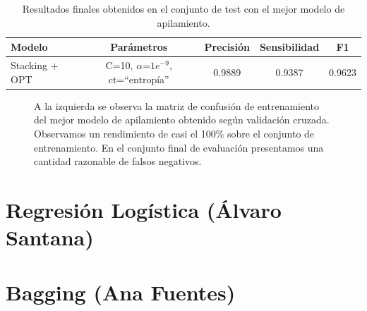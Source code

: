 \documentclass[12pt,letterpaper]{article}
\begin{document}
\begin{table}[!ht]
    \centering
    \begin{tabular}{lcccc}
        \hline
        \textbf{Modelo} & \textbf{Parámetros} &\textbf{Precisión} &\textbf{Sensibilidad} &\textbf{F1} \\\hline
        Stacking + OPT & C=10, $\alpha$=$1e^{-9}$, ct=``entropía'' & 0.9889 & 0.9387 & 0.9623\\ 
        \hline
    \end{tabular}
    \caption{Resultados finales obtenidos en el conjunto de test con el mejor modelo de apilamiento.}
    \label{tab:StackingFinalResults}
\end{table}

\begin{figure}[!ht]
\centering
{}
\caption{A la izquierda se observa la matriz de confusión de entrenamiento del mejor modelo de apilamiento obtenido según validación cruzada. Observamos un rendimiento de casi el 100\% sobre el conjunto de entrenamiento.
En el conjunto final de evaluación presentamos una cantidad razonable de falsos negativos.}
\label{fig:StackingMatrix}
\end{figure}


\section{Regresión Logística (Álvaro Santana)}
\section{Bagging (Ana Fuentes)}
\end{document}
